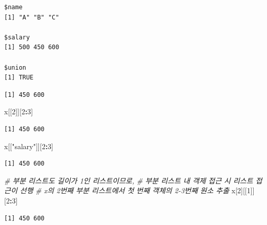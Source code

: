 \documentclass[
  11pt,
]{krantz}
\newenvironment{Shaded}{\begin{snugshade}}{\end{snugshade}}
\newcommand{\CommentTok}[1]{\textcolor[rgb]{0.37,0.37,0.37}{\textit{#1}}}
\newcommand{\DecValTok}[1]{\textcolor[rgb]{0.06,0.06,0.06}{#1}}
\newcommand{\NormalTok}[1]{#1}
\newcommand{\OperatorTok}[1]{\textcolor[rgb]{0.43,0.43,0.43}{\textbf{#1}}}
\newcommand{\StringTok}[1]{\textcolor[rgb]{0.5,0.5,0.5}{#1}}
\begin{document}
\begin{verbatim}
$name
[1] "A" "B" "C"

$salary
[1] 500 450 600

$union
[1] TRUE
\end{verbatim}

\begin{Shaded}
\end{Shaded}

\begin{verbatim}
[1] 450 600
\end{verbatim}

\begin{Shaded}
\begin{Highlighting}[]
\NormalTok{x[[}\DecValTok{2}\NormalTok{]][}\DecValTok{2}\OperatorTok{:}\DecValTok{3}\NormalTok{]}
\end{Highlighting}
\end{Shaded}

\begin{verbatim}
[1] 450 600
\end{verbatim}

\begin{Shaded}
\begin{Highlighting}[]
\NormalTok{x[[}\StringTok{"salary"}\NormalTok{]][}\DecValTok{2}\OperatorTok{:}\DecValTok{3}\NormalTok{]}
\end{Highlighting}
\end{Shaded}

\begin{verbatim}
[1] 450 600
\end{verbatim}

\begin{Shaded}
\begin{Highlighting}[]
\CommentTok{# 부분 리스트도 길이가 1인 리스트이므로, }
\CommentTok{# 부분 리스트 내 객제 접근 시 리스트 접근이 선행}
\CommentTok{# x의 2번째 부분 리스트에서 첫 번째 객체의 2-3번째 원소 추출}
\NormalTok{x[}\DecValTok{2}\NormalTok{][[}\DecValTok{1}\NormalTok{]][}\DecValTok{2}\OperatorTok{:}\DecValTok{3}\NormalTok{]}
\end{Highlighting}
\end{Shaded}

\begin{verbatim}
[1] 450 600
\end{verbatim}
\end{document}
